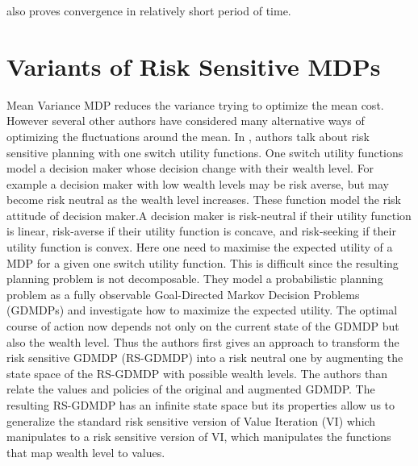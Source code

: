 \documentclass[11pt,a4paper,oneside]{report}
\begin{document}
also proves convergence in relatively short period of time.\\

\section{Variants of Risk Sensitive MDPs}
Mean Variance MDP reduces the variance trying to optimize the mean cost. However several other authors have considered many alternative ways of optimizing the fluctuations around the mean.
In \cite{liu2005risk}, authors talk about risk sensitive planning with one switch utility functions. One switch utility functions model a decision maker whose decision change with their wealth level. For example a decision maker with low wealth levels may be risk averse, but may become risk neutral as the wealth level increases. These function model the risk attitude of decision maker.A decision maker is risk-neutral if their utility function is linear, risk-averse if their utility function is concave, and risk-seeking if their utility function is convex. Here one need to maximise the expected utility of a MDP for a given one switch utility function. This is difficult since the resulting planning problem is not decomposable. They model a probabilistic planning problem as a fully observable Goal-Directed Markov Decision Problems (GDMDPs) and investigate how to maximize the expected utility. The optimal course of action now depends not only on the current state of the GDMDP but also the wealth level. Thus the authors first gives an approach to transform the risk sensitive GDMDP (RS-GDMDP) into a risk neutral one by augmenting the state space of the RS-GDMDP with possible wealth levels. The authors than relate the values and policies of the original and augmented GDMDP.  The resulting RS-GDMDP has an infinite state space but its properties allow us to generalize the standard risk sensitive version of Value Iteration (VI) which manipulates to a risk sensitive version of VI, which manipulates the functions that map wealth level to values.\\
\end{document}
